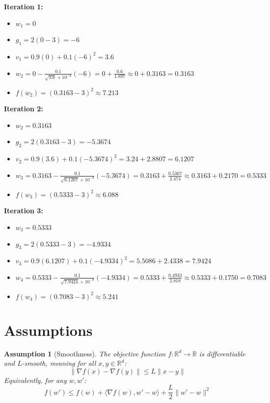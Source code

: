 \documentclass{article}
\newtheorem{assumption}{Assumption}
\begin{document}
\textbf{Iteration 1:}
\begin{itemize}
    \item $w_1 = 0$
    \item $g_1 = 2(0 - 3) = -6$
    \item $v_1 = 0.9(0) + 0.1(-6)^2 = 3.6$
    \item $w_2 = 0 - \frac{0.1}{\sqrt{3.6} + 10^{-8}} (-6) = 0 + \frac{0.6}{1.897} \approx 0 + 0.3163 = 0.3163$
    \item $f(w_2) = (0.3163 - 3)^2 \approx 7.213$
\end{itemize}

\textbf{Iteration 2:}
\begin{itemize}
    \item $w_2 = 0.3163$
    \item $g_2 = 2(0.3163 - 3) = -5.3674$
    \item $v_2 = 0.9(3.6) + 0.1(-5.3674)^2 = 3.24 + 2.8807 = 6.1207$
    \item $w_3 = 0.3163 - \frac{0.1}{\sqrt{6.1207} + 10^{-8}} (-5.3674) = 0.3163 + \frac{0.5367}{2.474} \approx 0.3163 + 0.2170 = 0.5333$
    \item $f(w_3) = (0.5333 - 3)^2 \approx 6.088$
\end{itemize}

\textbf{Iteration 3:}
\begin{itemize}
    \item $w_3 = 0.5333$
    \item $g_3 = 2(0.5333 - 3) = -4.9334$
    \item $v_3 = 0.9(6.1207) + 0.1(-4.9334)^2 = 5.5086 + 2.4338 = 7.9424$
    \item $w_4 = 0.5333 - \frac{0.1}{\sqrt{7.9424} + 10^{-8}} (-4.9334) = 0.5333 + \frac{0.4933}{2.818} \approx 0.5333 + 0.1750 = 0.7083$
    \item $f(w_4) = (0.7083 - 3)^2 \approx 5.241$
\end{itemize}

\newpage
\section*{Assumptions}
\begin{assumption}[Smoothness]
The objective function $f: \mathbb{R}^d \to \mathbb{R}$ is differentiable and $L$-smooth, meaning for all $x, y \in \mathbb{R}^d$:
$$ \|\nabla f(x) - \nabla f(y)\| \leq L \|x - y\| $$
Equivalently, for any $w, w'$:
$$ f(w') \leq f(w) + \langle \nabla f(w), w' - w \rangle + \frac{L}{2} \|w' - w\|^2 $$
\end{assumption}
\end{document}
